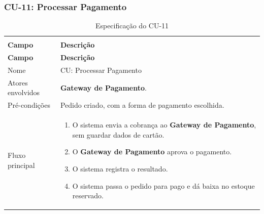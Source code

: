 \documentclass[12pt,a4paper]{article}
\begin{document}
\Needspace{200pt}
\subsubsection{CU-11: Processar Pagamento}

{\setlength{\arrayrulewidth}{0.3pt}\renewcommand{\arraystretch}{1.1}\small{}
\begin{xltabular}{\textwidth}{>{\raggedright\arraybackslash}p{3.4cm}|>{\raggedright\arraybackslash}X}
\caption{Especificação do CU-11}\\
\toprule{}
\textbf{Campo} & \textbf{Descrição}\\ \midrule{}
\endfirsthead
{}\toprule{}
\textbf{Campo} & \textbf{Descrição}\\ \midrule{}
\endhead
\endlastfoot
Nome & CU: Processar Pagamento\\ \hline
Atores envolvidos & \textbf{Gateway de Pagamento}.\\ \hline
Pré-condições & Pedido criado, com a forma de pagamento escolhida.\\ \hline
Fluxo principal & \begin{enumerate}[nosep,leftmargin=1.4em,label=\arabic*.,before=\vspace{-\baselineskip},after=\vspace{-0.4\baselineskip}]\item O sistema envia a cobrança ao \textbf{Gateway de Pagamento}, sem guardar dados de cartão. \item O \textbf{Gateway de Pagamento} aprova o pagamento. \item O sistema registra o resultado. \item O sistema passa o pedido para pago e dá baixa no estoque reservado. \end{enumerate}\\ \hline

\end{xltabular}}
\end{document}
